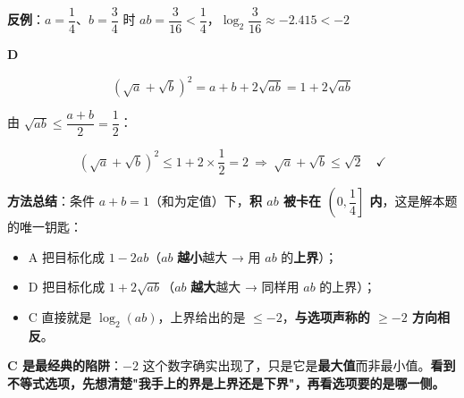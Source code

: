 \begin{answer}
\textbf{反例}：$a=\dfrac14$、$b=\dfrac34$ 时 $ab=\dfrac3{16}<\dfrac14$，$\log_2\dfrac3{16}\approx-2.415<-2$ 

\par\medskip

\textbf{D }

\nopagebreak[4]
\[\left(\sqrt a+\sqrt b\right)^{2}=a+b+2\sqrt{ab}=1+2\sqrt{ab}\]

由 $\sqrt{ab}\le\dfrac{a+b}2=\dfrac12$：

\nopagebreak[4]
\[\left(\sqrt a+\sqrt b\right)^{2}\le1+2\times\frac12=2\ \Longrightarrow\ \sqrt a+\sqrt b\le\sqrt2\quad\checkmark\]

\begin{gktip}
\textbf{方法总结}：条件 $a+b=1$（和为定值）下，\textbf{积 $ab$ 被卡在 $\left(0,\dfrac14\right]$ 内}，这是解本题的唯一钥匙：
\begin{itemize}
\item A 把目标化成 $1-2ab$（$ab$ \textbf{越小}越大 → 用 $ab$ 的\textbf{上界}）；
\item D 把目标化成 $1+2\sqrt{ab}$（$ab$ \textbf{越大}越大 → 同样用 $ab$ 的上界）；
\item C 直接就是 $\log_2(ab)$，上界给出的是 $\le-2$，\textbf{与选项声称的 $\ge-2$ 方向相反}。
\end{itemize}

\textbf{C 是最经典的陷阱}：$-2$ 这个数字确实出现了，只是它是\textbf{最大值}而非最小值。\textbf{看到不等式选项，先想清楚"我手上的界是上界还是下界"，再看选项要的是哪一侧。}
\end{gktip}


\par\medskip

\end{answer}

